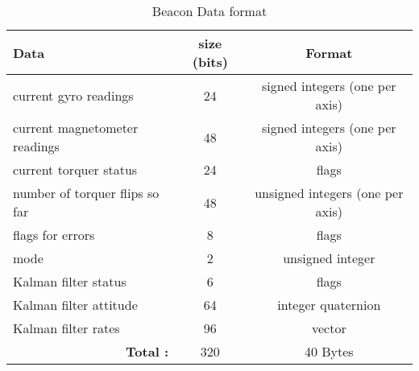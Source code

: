 \begin{table}[H]
    \centering
    \caption{Beacon Data format}
    \label{tab:beacondat}
    \begin{tabular}{|l|c|c|}
        \hline
        Data&size (bits)&Format\\
        \hline
        current gyro readings&24&signed integers (one per axis)\\
        \hline
        current magnetometer readings&48&signed integers (one per axis)\\
        \hline
        current torquer status&24&flags\\
        \hline
        number of torquer flips so far & 48 & unsigned integers (one per axis)\\
        \hline
        flags for errors& 8 & flags\\
        \hline
        mode&2&unsigned integer\\
        \hline
        Kalman filter status&6&flags\\
        \hline
        Kalman filter attitude&64&integer quaternion\\
        \hline
        Kalman filter rates&96&vector\\
        \hline
        \multicolumn{1}{|r|}{\bfseries Total :}&320&40 Bytes\\
        \hline
    \end{tabular}
\end{table}

